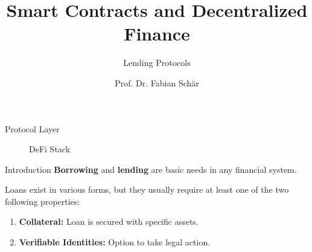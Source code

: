 \documentclass[handout]{beamer}
\title{Smart Contracts and Decentralized Finance}
\subtitle{Lending Protocols}
\author{Prof. Dr. Fabian Schär}
\institute{University of Basel}
\begin{document}
\thispagestyle{empty}
\begin{frame}[noframenumbering]
	\titlepage
\end{frame}

\begin{frame}{Protocol Layer}

\begin{figure}[t]
	\centering
	\resizebox{0.9\textwidth}{!}{
	\begin{tikzpicture}[scale=1.0, every node/.style={scale=1.0}]
		
	\end{tikzpicture}}
	\caption{DeFi Stack \cite{FS:21}}
\end{figure}
	
\end{frame}


\begin{frame}{Introduction}
\textbf{Borrowing} and \textbf{lending} are basic needs in any financial system. \\

\vspace{1em}

 {
Loans exist in various forms, but they usually require at least one of the two following properties:
\vspace{0.5em}
\begin{enumerate}
  \item \textbf{Collateral:} Loan is secured with specific assets.
  \item \textbf{Verifiable Identities:} Option to take legal action.
\end{enumerate} 
}

\vspace{1em}

\end{frame}
\end{document}
